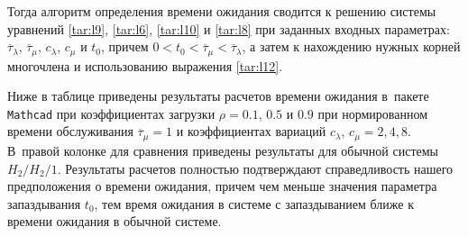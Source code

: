 Тогда алгоритм определения времени ожидания сводится к решению системы уравнений \eqref{tar:l9}, \eqref{tar:l6}, \eqref{tar:l10} и \eqref{tar:l8} при заданных входных параметрах: $\overline{\tau}_{\lambda}$, $\overline{\tau}_{\mu}$, $c_{\lambda}$, $c_{\mu}$ и $t_0$, причем $0<t_0<\overline{\tau}_{\mu}<\overline{\tau}_{\lambda}$, а затем к нахождению нужных корней многочлена и использованию выражения \eqref{tar:l12}. 

Ниже в таблице приведены результаты расчетов времени ожидания в~пакете {\tt Mathcad} при коэффициентах загрузки $\rho=0.1$, $0.5$ и $0.9$ при нормированном времени обслуживания $\overline{\tau}_{\mu}=1$ и коэффициентах вариаций ${c_{\lambda},\,c_{\mu}=2,4,8}$. В~правой колонке для сравнения приведены результаты для обычной системы $H_2/H_2/1$. 
Результаты расчетов полностью подтверждают справедливость нашего предположения о времени ожидания, причем чем меньше значения параметра запаздывания $t_0$, тем время ожидания в системе с запаздыванием ближе к времени ожидания в обычной системе.

